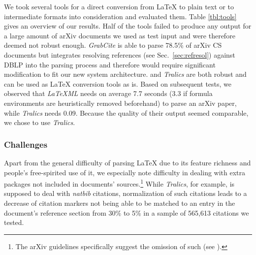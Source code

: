 We took several tools for a direct conversion from \LaTeX{} to plain text or to intermediate formats into consideration and evaluated them. Table \ref{tbl:tools} gives an overview of our results. Half of the tools failed to produce any output for a large amount of arXiv documents we used as test input and were therefore deemed not robust enough. \textit{GrabCite} \cite{Faerber2018LREC} is able to parse 78.5\%
of arXiv CS documents but integrates resolving references (see Sec.~\ref{sec:refresol}) against DBLP into the parsing process and therefore would require significant modification to fit our new system architecture. \textit{\LaTeXML} and \textit{Tralics} are both robust and can be used as \LaTeX{} conversion tools as is. Based on subsequent tests, we observed that \textit{LaTeXML} needs on average 7.7 seconds (3.3 if formula environments are heuristically removed beforehand) to parse an arXiv paper, while \textit{Tralics} needs 0.09. Because the quality of their output seemed comparable, we chose to use \textit{Tralics}.

\subsubsection{Challenges}\label{sec:refresolchallenges}
Apart from the general difficulty of parsing \LaTeX{} due to its feature richness and people's free-spirited use of it, we especially note difficulty in dealing with extra packages not included in documents' sources.\footnote{The arXiv guidelines specifically suggest the omission of such (see ).} While \textit{Tralics}, for example, is supposed to deal with \textit{natbib} citations, normalization of such citations leads to a decrease of citation markers not being able to be matched to an entry in the document's reference section from 30\% to 5\% in a sample of 565,613 citations we tested.

